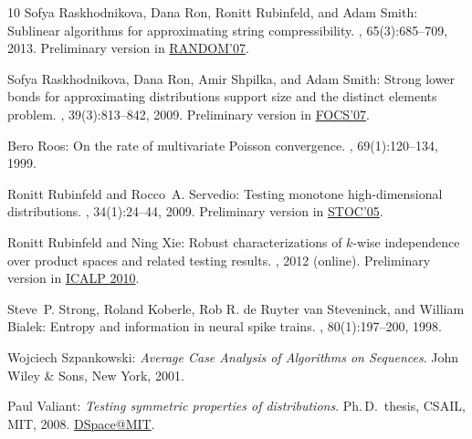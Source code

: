 \begin{thebibliography}{10}
{\sc Sofya Raskhodnikova, Dana Ron, Ronitt Rubinfeld, and Adam Smith}:
  Sublinear algorithms for approximating string compressibility.
, 65(3):685--709, 2013.
\newblock Preliminary version in
  \href{http://dx.doi.org/10.1007/978-3-540-74208-1_44}{RANDOM'07}.
\newblock [\epfmtdoi{10.1007/s00453-012-9618-6}]

{\sc Sofya Raskhodnikova, Dana Ron, Amir Shpilka, and Adam Smith}: Strong lower
  bonds for approximating distributions support size and the distinct elements
  problem.
, 39(3):813--842, 2009.
\newblock Preliminary version in
  \href{http://dx.doi.org/10.1109/FOCS.2007.47}{FOCS'07}.
\newblock [\epfmtdoi{10.1137/070701649}]

{\sc Bero Roos}: On the rate of multivariate {P}oisson convergence.
, 69(1):120--134, 1999.

{\sc Ronitt Rubinfeld and Rocco~A. Servedio}: Testing monotone high-dimensional
  distributions.
, 34(1):24--44, 2009.
\newblock Preliminary version in
  \href{http://dx.doi.org/10.1145/1060590.1060613}{STOC'05}.

{\sc Ronitt Rubinfeld and Ning Xie}: Robust characterizations of $k$-wise
  independence over product spaces and related testing results.
, 2012 (online).
\newblock Preliminary version in
  \href{http://dx.doi.org/10.1007/978-3-642-14165-2\_48}{ICALP 2010}.

{\sc Steve~P. Strong, Roland Koberle, {Rob R. de Ruyter van} Steveninck, and
  William Bialek}: Entropy and information in neural spike trains.
, 80(1):197--200, 1998.

{\sc Wojciech Szpankowski}: {\em Average Case Analysis of Algorithms on
  Sequences}.
\newblock John Wiley {\&} Sons, New York, 2001.

{\sc Paul Valiant}: {\em Testing symmetric properties of distributions}.
\newblock Ph.\,D.\ thesis, CSAIL, MIT, 2008.
\newblock \href{http://hdl.handle.net/1721.1/44717}{DSpace@MIT}.


\end{thebibliography}
